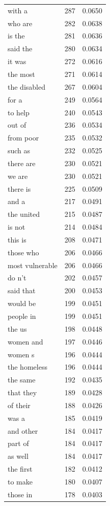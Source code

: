 \begin{tabular}{lrl}
with a & 287 & 0.0650 \\
who are & 282 & 0.0638 \\
is the & 281 & 0.0636 \\
said the & 280 & 0.0634 \\
it was & 272 & 0.0616 \\
the most & 271 & 0.0614 \\
the disabled & 267 & 0.0604 \\
for a & 249 & 0.0564 \\
to help & 240 & 0.0543 \\
out of & 236 & 0.0534 \\
from poor & 235 & 0.0532 \\
such as & 232 & 0.0525 \\
there are & 230 & 0.0521 \\
we are & 230 & 0.0521 \\
there is & 225 & 0.0509 \\
and a & 217 & 0.0491 \\
the united & 215 & 0.0487 \\
is not & 214 & 0.0484 \\
this is & 208 & 0.0471 \\
those who & 206 & 0.0466 \\
most vulnerable & 206 & 0.0466 \\
do n't & 202 & 0.0457 \\
said that & 200 & 0.0453 \\
would be & 199 & 0.0451 \\
people in & 199 & 0.0451 \\
the us & 198 & 0.0448 \\
women and & 197 & 0.0446 \\
women s & 196 & 0.0444 \\
the homeless & 196 & 0.0444 \\
the same & 192 & 0.0435 \\
that they & 189 & 0.0428 \\
of their & 188 & 0.0426 \\
was a & 185 & 0.0419 \\
and other & 184 & 0.0417 \\
part of & 184 & 0.0417 \\
as well & 184 & 0.0417 \\
the first & 182 & 0.0412 \\
to make & 180 & 0.0407 \\
those in & 178 & 0.0403 \\

\end{tabular}
